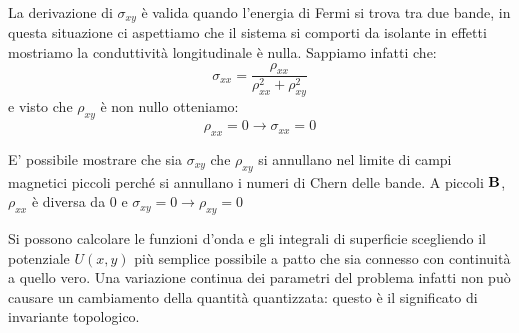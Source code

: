 \documentclass[12pt,a4paper]{article}
\begin{document}
La derivazione di $\sigma_{xy}$ è valida quando l'energia di Fermi si trova tra due bande, in questa situazione ci aspettiamo che il sistema si comporti da isolante in effetti mostriamo la conduttività longitudinale è nulla. Sappiamo infatti che:
$$\sigma_{xx} = \frac{\rho_{xx}}{\rho_{xx}^2 + \rho_{xy}^2} $$ e visto che $\rho_{xy}$ è non nullo otteniamo: 
\begin{equation}
\rho_{xx} = 0 \rightarrow \sigma_{xx} = 0
\end{equation}

E' possibile mostrare che sia $\sigma_{xy}$ che $\rho_{xy}$ si annullano nel limite di campi magnetici piccoli perché si annullano i numeri di Chern delle bande. A piccoli $\bold{B}$, $\rho_{xx}$ è diversa da 0 e $\sigma_{xy} = 0 \rightarrow \rho_{xy} = 0$



Si possono calcolare le funzioni d'onda e gli integrali di superficie scegliendo il potenziale $U(x, y)$ più semplice possibile a patto che sia connesso con continuità a quello vero. Una variazione continua dei parametri del problema infatti non può causare un cambiamento della quantità quantizzata: questo è il significato di invariante topologico.
\end{document}
